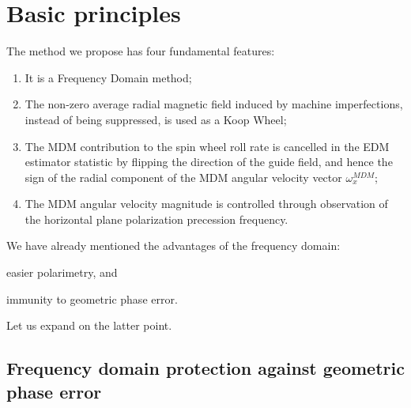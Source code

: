 \documentclass[a4paper]{jacow}
\newcommand{\w}{\omega}
\begin{document}
\section{Basic principles}

The method we propose has four fundamental features:
\begin{enumerate}
\item It is a Frequency Domain method;
\item The non-zero average radial magnetic field induced by machine imperfections, instead of being suppressed,
  is used as a Koop Wheel;
\item The MDM contribution to the spin wheel roll rate is cancelled in the EDM estimator statistic
  by flipping the direction of the guide field, and hence the sign of the radial component of the MDM
  angular velocity vector $\w_x^{MDM}$;
\item The MDM angular velocity magnitude is controlled through observation of the horizontal plane
  polarization precession frequency.
\end{enumerate}

We have already mentioned the advantages of the frequency domain:
\begin{inparaenum}
\item easier polarimetry, and
\item immunity to geometric phase error.
\end{inparaenum}
Let us expand on the latter point.

\subsection{Frequency domain protection against geometric phase error}
\end{document}
